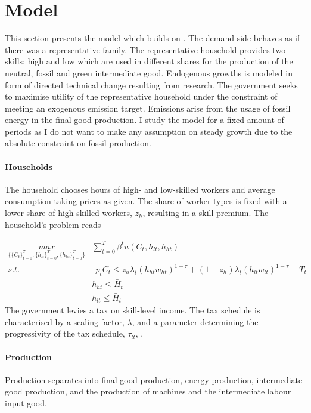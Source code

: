 
\section{Model}
This section presents the model which builds on \cite{Fried2018ClimateAnalysis}. 
The demand side behaves as if there was a representative family. The representative household provides two skills: high and low which are used in different shares for the production of the neutral, fossil and green intermediate good.
Endogenous growths is modeled in form of directed technical change resulting from research. The government seeks to maximise utility of the representative household under the constraint of meeting an exogenous emission target. Emissions arise from the usage of fossil energy in the final good production. 
I study the model for a fixed amount of periods as I do not want to make any assumption on steady growth due to the absolute constraint on fossil production. 

\paragraph{Households}
 The household chooses hours of high- and low-skilled workers and average consumption taking prices as given. The share of worker types is fixed with a lower share of high-skilled workers, $z_h$, resulting in a skill premium. The household's problem reads

\begin{align}
\underset{\{\{C_{t}\}_{t=0}^{T}, \{h_{lt}\}_{t=0}^{T}, \{h_{ht}\}_{t=0}^{T}\}}{max}&
\sum_{t=0}^{T}\beta^t u(C_{t}, h_{lt}, h_{ht})\\
s.t.& \ \ p_{t}C_{t}\leq%
z_h\lambda_t \left(h_{ht}w_{ht}\right)^{1-\tau}+(1-z_h)\lambda_t\left(h_{lt}w_{lt}\right)^{1-\tau}+T_t\\
\ & h_{ht}\leq \bar{H}_t\\
\ & h_{lt}\leq \bar{H}_t
\end{align}
The government levies a tax on skill-level income. The tax schedule is characterised by  a scaling factor, $\lambda$, and a parameter determining the progressivity of the tax schedule, $\tau_{lt}$, \citep[compare, e.g.,][]{Heathcote2017OptimalFramework}. 

\paragraph{Production}
Production separates into final good production, energy production, intermediate good production, and the production of machines and the intermediate labour input good. 


